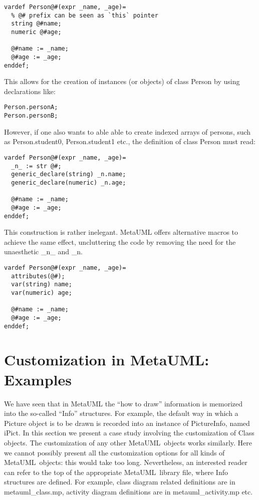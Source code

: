 \documentclass{article}
\newcommand{\code}{\ttfamily}
\newcommand{\metauml}{MetaUML}
\begin{document}
\begin{verbatim}
vardef Person@#(expr _name, _age)=
  % @# prefix can be seen as `this` pointer
  string @#name;
  numeric @#age;

  @#name := _name;
  @#age := _age;
enddef;
\end{verbatim}

This allows for the creation of instances (or objects) of class {\code Person} by using
declarations like:

\begin{verbatim}
Person.personA;
Person.personB;
\end{verbatim}

 However, if one also wants to able able to create indexed arrays of persons, such as
{\code Person.student0}, {\code Person.student1} etc., the definition of class
{\code Person} must read:

\begin{verbatim}
vardef Person@#(expr _name, _age)=
  _n_ := str @#;
  generic_declare(string) _n.name;
  generic_declare(numeric) _n.age;

  @#name := _name;
  @#age := _age;
enddef;
\end{verbatim}

This construction is rather inelegant. MetaUML offers alternative macros to achieve
the same effect, uncluttering the code by removing the need for the unaesthetic {\code \_n\_} and
{\code \_n}.

\begin{verbatim}
vardef Person@#(expr _name, _age)=
  attributes(@#);
  var(string) name;
  var(numeric) age;

  @#name := _name;
  @#age := _age;
enddef;
\end{verbatim}

\section{Customization in MetaUML: Examples}
\label{section:customization}

We have seen that in MetaUML the ``how to draw'' information is memorized into the so-called
``{\code Info}'' structures. For example, the default way in which a {\code Picture} object is
to be drawn is recorded into an instance of {\code PictureInfo}, named {\code iPict}. In this section we
present a case study involving the customization of {\code Class} objects. The customization of
any other \metauml\ objects works similarly. Here we cannot possibly present all the customization
options for all kinds of \metauml\ objects: this would take too long. Nevertheless, an interested reader can refer
to the top of the appropriate \metauml\ library file, where {\code Info} structures are defined.
For example, class diagram related definitions are in {\code metauml\_class.mp}, activity diagram
definitions are in {\code metauml\_activity.mp} etc.
\end{document}
